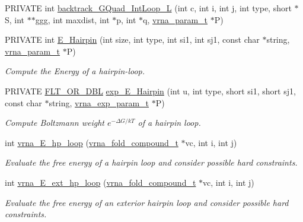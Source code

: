 \begin{DoxyCompactItemize}
\item 
P\+R\+I\+V\+A\+T\+E int \hyperlink{group__loops_ga7b371308fa5a45c7ac353ef6ed1014de}{backtrack\+\_\+\+G\+Quad\+\_\+\+Int\+Loop\+\_\+\+L} (int c, int i, int j, int type, short $\ast$S, int $\ast$$\ast$ggg, int maxdist, int $\ast$p, int $\ast$q, \hyperlink{group__energy__parameters_ga8a69ca7d787e4fd6079914f5343a1f35}{vrna\+\_\+param\+\_\+t} $\ast$P)
\item 
P\+R\+I\+V\+A\+T\+E int \hyperlink{group__loops_gadf943ee9a45b7f4cee9192c06210dace}{E\+\_\+\+Hairpin} (int size, int type, int si1, int sj1, const char $\ast$string, \hyperlink{group__energy__parameters_ga8a69ca7d787e4fd6079914f5343a1f35}{vrna\+\_\+param\+\_\+t} $\ast$P)
\begin{DoxyCompactList}\small\item\em Compute the Energy of a hairpin-\/loop. \end{DoxyCompactList}\item 
P\+R\+I\+V\+A\+T\+E \hyperlink{group__data__structures_ga31125aeace516926bf7f251f759b6126}{F\+L\+T\+\_\+\+O\+R\+\_\+\+D\+B\+L} \hyperlink{group__loops_ga51fb555974f180b78d76142b2894851c}{exp\+\_\+\+E\+\_\+\+Hairpin} (int u, int type, short si1, short sj1, const char $\ast$string, \hyperlink{group__energy__parameters_ga01d8b92fe734df8d79a6169482c7d8d8}{vrna\+\_\+exp\+\_\+param\+\_\+t} $\ast$P)
\begin{DoxyCompactList}\small\item\em Compute Boltzmann weight $e^{-\Delta G/kT} $ of a hairpin loop. \end{DoxyCompactList}\item 
int \hyperlink{group__loops_ga999ba163a8148d72fd5f22819a681df7}{vrna\+\_\+\+E\+\_\+hp\+\_\+loop} (\hyperlink{group__fold__compound_ga1b0cef17fd40466cef5968eaeeff6166}{vrna\+\_\+fold\+\_\+compound\+\_\+t} $\ast$vc, int i, int j)
\begin{DoxyCompactList}\small\item\em Evaluate the free energy of a hairpin loop and consider possible hard constraints. \end{DoxyCompactList}\item 
int \hyperlink{group__loops_gac3393ee309372eccae944e3a07f455f9}{vrna\+\_\+\+E\+\_\+ext\+\_\+hp\+\_\+loop} (\hyperlink{group__fold__compound_ga1b0cef17fd40466cef5968eaeeff6166}{vrna\+\_\+fold\+\_\+compound\+\_\+t} $\ast$vc, int i, int j)
\begin{DoxyCompactList}\small\item\em Evaluate the free energy of an exterior hairpin loop and consider possible hard constraints. \end{DoxyCompactList}\item 
$$
\end{DoxyCompactItemize}
